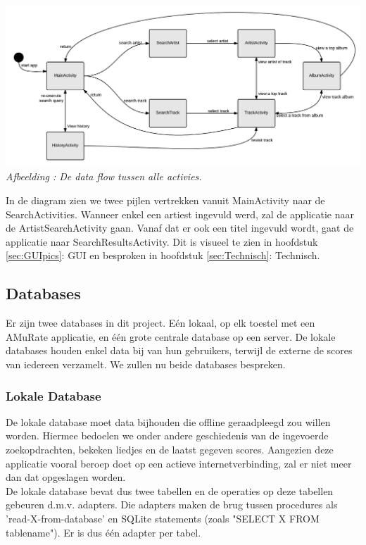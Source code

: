 \documentclass[11pt,a4paper]{article}
\newcounter{figc}
\newcommand{\increaseFigID} {%
   \stepcounter{figc}%
   \thefigc}
\newcommand{\figID}[1]{\small \textit{Afbeelding \increaseFigID : #1} \\ \normalsize}
\begin{document}
	\hspace{-5em} \includegraphics[scale=0.4]{Pictures/Dataflow2.png} \newline
	\figID{De data flow tussen alle activies.} 
	
	In de diagram zien we twee pijlen vertrekken vanuit MainActivity naar de SearchActivities. Wanneer enkel een artiest ingevuld werd, zal de applicatie naar de ArtistSearchActivity gaan. Vanaf dat er ook een titel ingevuld wordt, gaat de applicatie naar SearchResultsActivity. Dit is visueel te zien in hoofdstuk \ref{sec:GUIpics}: GUI en besproken in hoofdstuk \ref{sec:Technisch}: Technisch.
	
	\subsection{Databases}
	\label{sec:Databases}
	Er zijn twee databases in dit project. Eén lokaal, op elk toestel met een AMuRate applicatie, en één grote centrale database op een server. De lokale databases houden enkel data bij van hun gebruikers, terwijl de externe de scores van iedereen verzamelt. We zullen nu beide databases bespreken.
	
	\subsubsection{Lokale Database}
	\label{sec:Lokale Database}
	De lokale database moet data bijhouden die offline geraadpleegd zou willen worden. Hiermee bedoelen we onder andere geschiedenis van de ingevoerde zoekopdrachten, bekeken liedjes en de laatst gegeven scores. Aangezien deze applicatie vooral beroep doet op een actieve internetverbinding, zal er niet meer dan dat opgeslagen worden. \\ \newline 
	De lokale database bevat dus twee tabellen en de operaties op deze tabellen gebeuren d.m.v. adapters. Die adapters maken de brug tussen procedures als 'read-X-from-database' en SQLite statements (zoals "SELECT X FROM tablename"). Er is dus één adapter per tabel. \newline
	 
\end{document}
